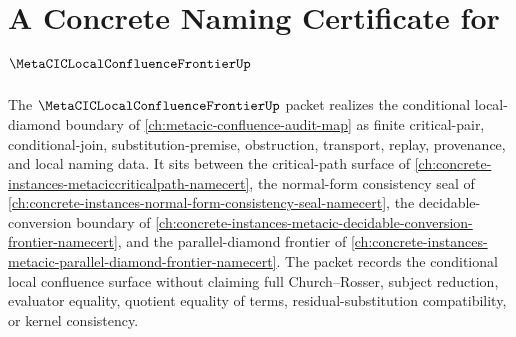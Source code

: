 \chapter{A Concrete Naming Certificate for $\MetaCICLocalConfluenceFrontierUp$}
\label{ch:concrete-instances-metacic-local-confluence-frontier-namecert}

The $\MetaCICLocalConfluenceFrontierUp$ packet realizes the conditional local-diamond boundary of \autoref{ch:metacic-confluence-audit-map} as finite critical-pair, conditional-join, substitution-premise, obstruction, transport, replay, provenance, and local naming data. It sits between the critical-path surface of \autoref{ch:concrete-instances-metaciccriticalpath-namecert}, the normal-form consistency seal of \autoref{ch:concrete-instances-normal-form-consistency-seal-namecert}, the decidable-conversion boundary of \autoref{ch:concrete-instances-metacic-decidable-conversion-frontier-namecert}, and the parallel-diamond frontier of \autoref{ch:concrete-instances-metacic-parallel-diamond-frontier-namecert}. The packet records the conditional local confluence surface without claiming full Church--Rosser, subject reduction, evaluator equality, quotient equality of terms, residual-substitution compatibility, or kernel consistency.



